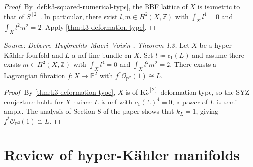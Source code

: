 \begin{proof}
  By \cref{def:k3-squared-numerical-type}, the BBF lattice of \(X\) is isometric to that
  of \(S^{[2]}\).  In particular, there exist \(l, m \in H^2(X, \mathbb{Z})\) with
  \(\int_X l^4 = 0\) and \(\int_X l^2 m^2 = 2\).  Apply \cref{thm:k3-deformation-type}.
\end{proof}

\begin{theorem}
  \label{thm:lagrangian-fibration}
  \textit{Source: Debarre--Huybrechts--Macr\`i--Voisin \cite{MR4654610}, Theorem 1.3.}
  Let \(X\) be a hyper-K\"ahler fourfold and \(L\) a nef line bundle on \(X\).  Set
  \(l \coloneqq c_1(L)\) and assume there exists \(m \in H^2(X, \mathbb{Z})\) with
  \(\int_X l^4 = 0\) and \(\int_X l^2 m^2 = 2\).  There exists a Lagrangian fibration
  \(f \colon X \to \mathbb{P}^2\) with \(f^*\mathcal{O}_{\mathbb{P}^2}(1) \cong L\).
\end{theorem}

\begin{proof}
  By \cref{thm:k3-deformation-type}, \(X\) is of \(\mathrm{K3}^{[2]}\) deformation type,
  so the SYZ conjecture holds for \(X\) \cite[Theorem~1.3]{Ma4}: since \(L\) is nef with
  \(c_1(L)^4 = 0\), a power of \(L\) is semi-ample.  The analysis of Section 8 of the
  paper shows that \(k_L = 1\), giving \(f^*\mathcal{O}_{\mathbb{P}^2}(1) \cong L\).
\end{proof}

\section{Review of hyper-K\"ahler manifolds}

